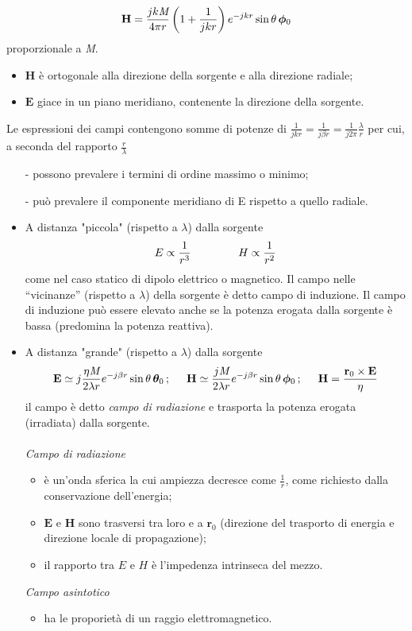 \documentclass[a4paper]{article}
\begin{document}
\begin{equation*}
\textbf{H}=\frac{jk\emph{M}}{4\pi r}\left(1+\frac{1}{jkr}\right)e^{-jkr}\sin\theta\,\bm{\phi}_0
\end{equation*}
proporzionale a \emph{M}.
\begin{itemize}
\item $\textbf{H}$ è ortogonale alla direzione della sorgente e alla direzione radiale;
\item $\textbf{E}$ giace in un piano meridiano, contenente la direzione della sorgente.
\end{itemize}
Le espressioni dei campi contengono somme di potenze di $\frac{1}{jkr}=\frac{1}{j\beta r}=\frac{1}{j2\pi}\frac{\lambda}{r}$ per cui, a seconda del rapporto $\frac{r}{\lambda}$
\begin{itemize}
\item[-] possono prevalere i termini di ordine massimo o minimo;
\item[-] può prevalere il componente meridiano di E rispetto a quello radiale.
\end{itemize}
\begin{itemize}
\item A distanza "piccola" (rispetto a $\lambda$) dalla sorgente
\begin{equation*}
E\propto\frac{1}{r^3}\hspace{15mm}H\propto\frac{1}{r^2}
\end{equation*}
come nel caso statico di dipolo elettrico o magnetico.
Il campo nelle “vicinanze” (rispetto a $\lambda$) della sorgente è detto campo di induzione.
Il campo di induzione può essere elevato anche se la potenza erogata dalla
sorgente è bassa (predomina la potenza reattiva).
\item A distanza "grande" (rispetto a $\lambda$) dalla sorgente
\begin{equation*}
\textbf{E}\simeq j\frac{\eta\emph{M}}{2\lambda r}e^{-j\beta r}\sin\theta\,\bm{\theta}_0\,;\hspace{5mm}\textbf{H}\simeq\frac{j\emph{M}}{2\lambda r}e^{-j\beta r}\sin\theta\,\bm{\phi}_0\,;\hspace{5mm}\textbf{H}=\frac{\textbf{r}_0\times\textbf{E}}{\eta}
\end{equation*}
il campo è detto \emph{campo di radiazione} e trasporta la potenza erogata (irradiata) dalla sorgente.\\\\
\emph{Campo di radiazione}
\begin{itemize}
\item è un'onda sferica la cui ampiezza decresce come $\frac{1}{r}$, come richiesto dalla conservazione dell'energia;
\item $\textbf{E}$ e $\textbf{H}$ sono trasversi tra loro e a $\textbf{r}_0$ (direzione del trasporto di energia e direzione locale di propagazione);
\item il rapporto tra $E$ e $H$ è l'impedenza intrinseca del mezzo.
\end{itemize}
\emph{Campo asintotico}
\begin{itemize}
\item ha le proporietà di un raggio elettromagnetico.
\end{itemize}
\end{itemize}
\end{document}
